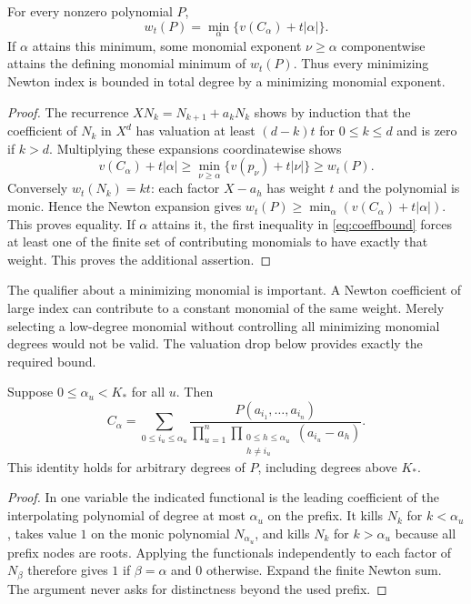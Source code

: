 \documentclass[11pt]{article}
\begin{document}
\begin{lemma}\label{lem:triangular}
For every nonzero polynomial $P$,
\begin{equation}\label{eq:weighted}
 w_t(P)=\min_\alpha\{v(C_\alpha)+t|\alpha|\}.
\end{equation}
If $\alpha$ attains this minimum, some monomial exponent $\nu\ge\alpha$ componentwise attains the defining monomial minimum of $w_t(P)$. Thus every minimizing Newton index is bounded in total degree by a minimizing monomial exponent.
\end{lemma}
\begin{proof}
The recurrence $XN_k=N_{k+1}+a_kN_k$ shows by induction that the coefficient of $N_k$ in $X^d$ has valuation at least $(d-k)t$ for $0\le k\le d$ and is zero if $k>d$. Multiplying these expansions coordinatewise shows
\begin{equation}\label{eq:coeffbound}
 v(C_\alpha)+t|\alpha|\ge\min_{\nu\ge\alpha}\{v(p_\nu)+t|\nu|\}\ge w_t(P).
\end{equation}
Conversely $w_t(N_k)=kt$: each factor $X-a_h$ has weight $t$ and the polynomial is monic. Hence the Newton expansion gives $w_t(P)\ge\min_\alpha(v(C_\alpha)+t|\alpha|)$. This proves equality. If $\alpha$ attains it, the first inequality in \eqref{eq:coeffbound} forces at least one of the finite set of contributing monomials to have exactly that weight. This proves the additional assertion.
\end{proof}

The qualifier about a minimizing monomial is important. A Newton coefficient of large index can contribute to a constant monomial of the same weight. Merely selecting a low-degree monomial without controlling all minimizing monomial degrees would not be valid. The valuation drop below provides exactly the required bound.

\begin{lemma}\label{lem:dd}
Suppose $0\le\alpha_u<K_*$ for all $u$. Then
\begin{equation}\label{eq:dd}
 C_\alpha=\sum_{0\le i_u\le\alpha_u}
 \frac{P(a_{i_1},\ldots,a_{i_n})}{\displaystyle\prod_{u=1}^n\prod_{\substack{0\le h\le\alpha_u\\h\ne i_u}}(a_{i_u}-a_h)}.
\end{equation}
This identity holds for arbitrary degrees of $P$, including degrees above $K_*$.
\end{lemma}
\begin{proof}
In one variable the indicated functional is the leading coefficient of the interpolating polynomial of degree at most $\alpha_u$ on the prefix. It kills $N_k$ for $k<\alpha_u$, takes value $1$ on the monic polynomial $N_{\alpha_u}$, and kills $N_k$ for $k>\alpha_u$ because all prefix nodes are roots. Applying the functionals independently to each factor of $N_\beta$ therefore gives $1$ if $\beta=\alpha$ and $0$ otherwise. Expand the finite Newton sum. The argument never asks for distinctness beyond the used prefix.
\end{proof}
\end{document}
